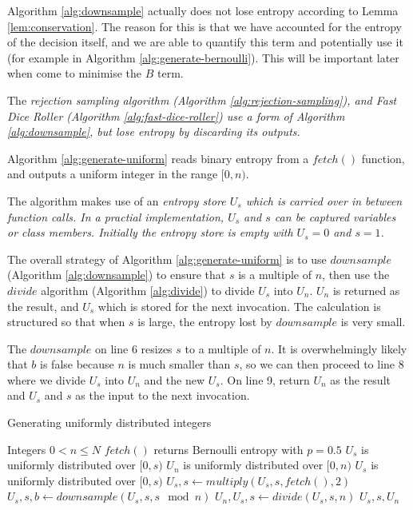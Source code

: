 \documentclass[12pt]{article}
\begin{document}
Algorithm \ref{alg:downsample} actually does not lose entropy according to Lemma \ref{lem:conservation}. The reason for this is that we have accounted for the entropy of the decision itself, and we are able to quantify this term and potentially use it (for example in Algorithm \ref{alg:generate-bernoulli}). This will be important later when come to minimise the $B$ term.

The \em rejection sampling \em algorithm (Algorithm \ref{alg:rejection-sampling}), and Fast Dice Roller (Algorithm \ref{alg:fast-dice-roller}) use a form of Algorithm \ref{alg:downsample}, but lose entropy by discarding its outputs.

Algorithm \ref{alg:generate-uniform} reads binary entropy from a $fetch()$ function, and outputs a uniform integer in the range $[0,n)$. 

The algorithm makes use of an \em entropy store \em $U_s$ which is carried over in between function calls. In a practial implementation, $U_s$ and $s$ can be captured variables or class members. Initially the entropy store is empty with $U_s = 0$ and $s=1$.

The overall strategy of Algorithm \ref{alg:generate-uniform} is to use $downsample$ (Algorithm \ref{alg:downsample}) to ensure that $s$ is a multiple of $n$, then use the $divide$ algorithm (Algorithm \ref{alg:divide}) to divide $U_s$ into $U_n$. $U_n$ is returned as the result, and $U_s$ which is stored for the next invocation. The calculation is structured so that when $s$ is large, the entropy lost by $downsample$ is very small.

The $downsample$ on line 6 resizes $s$ to a multiple of $n$. It is overwhelmingly likely that $b$ is false because $n$ is much smaller than $s$, so we can then proceed to line 8 where we divide $U_s$ into $U_n$ and the new $U_s$. On line 9, return $U_n$ as the result and $U_s$ and $s$ as the input to the next invocation.

\begin{algorithm}
\caption{Generating uniformly distributed integers}
\label{alg:generate-uniform}
\begin{algorithmic}[1]
\Require Integers $0 < n\le N$
\Require $fetch()$ returns Bernoulli entropy with $p=0.5$
\Require $U_s$ is uniformly distributed over $[0,s)$
\Ensure $U_n$ is uniformly distributed over $[0,n)$
\Ensure $U_s$ is uniformly distributed over $[0,s)$
        \State $U_s, s \gets multiply(U_s, s, fetch(), 2)$
    \EndWhile
    \State $U_s, s, b \gets downsample(U_s, s, s \mod n)$ 
        \State $U_n, U_s, s \gets divide(U_s, s, n)$
        \State \Return $U_s, s, U_n$
    \EndIf
  \EndWhile
\EndProcedure
\end{algorithmic}
\end{algorithm}
\end{document}

